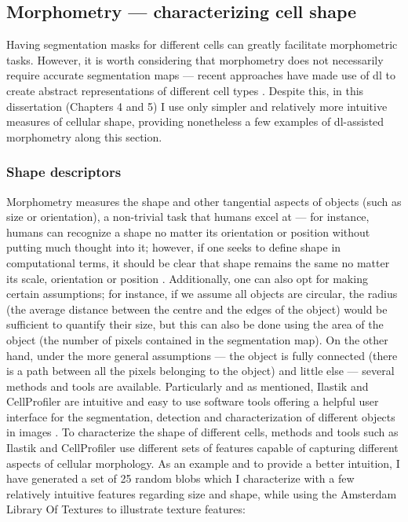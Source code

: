 \subsection{Morphometry --- characterizing cell shape}

Having segmentation masks for different cells can greatly facilitate morphometric tasks. However, it is worth considering that morphometry does not necessarily require accurate segmentation maps --- recent approaches have made use of \ac{dl} to create abstract representations of different cell types \cite{Sommer2017-uj,Wei2021-gw}. Despite this, in this dissertation (Chapters 4 and 5) I use only simpler and relatively more intuitive measures of cellular shape, providing nonetheless a few examples of \ac{dl}-assisted morphometry along this section. 

\subsubsection{Shape descriptors}

Morphometry measures the shape and other tangential aspects of objects (such as size or orientation), a non-trivial task that humans excel at --- for instance, humans can recognize a shape no matter its orientation or position without putting much thought into it; however, if one seeks to define shape in computational terms, it should be clear that shape remains the same no matter its scale, orientation or position \cite{Kendall1977-yx}. Additionally, one can also opt for making certain assumptions; for instance, if we assume all objects are circular, the radius (the average distance between the centre and the edges of the object) would be sufficient to quantify their size, but this can also be done using the area of the object (the number of pixels contained in the segmentation map). On the other hand, under the more general assumptions --- the object is fully connected (there is a path between all the pixels belonging to the object) and little else --- several methods and tools are available. Particularly and as mentioned, Ilastik and CellProfiler are intuitive and easy to use software tools offering a helpful user interface for the segmentation, detection and characterization of different objects in images \cite{Sommer2011-ds,Carpenter2006-hy}. To characterize the shape of different cells, methods and tools such as Ilastik and CellProfiler use different sets of features capable of capturing different aspects of cellular morphology. As an example and to provide a better intuition, I have generated a set of 25 random blobs which I characterize with a few relatively intuitive features regarding size and shape, while using the Amsterdam Library Of Textures \cite{Burghouts2009-ln} to illustrate texture features:

